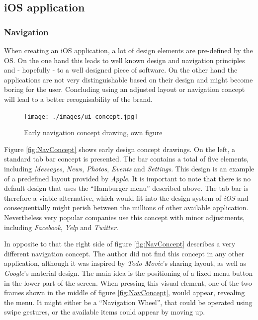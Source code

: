 \subsection{iOS application}
\label{sec:UIConceptiOS}
\subsubsection{Navigation}
When creating an iOS application, a lot of design elements are pre-defined by the \gls{OS}. On the one hand this leads to well known design and navigation principles and - hopefully - to a well designed piece of software. On the other hand the applications are not very distinguishable based on their design and might become boring for the user. Concluding using an adjusted layout or navigation concept will lead to a better recognisability of the brand. 

\begin{figure}[h]
  	\centering
  	\texttt{[image: ./images/ui-concept.jpg]}
  	\caption{Early navigation concept drawing, own figure}
	\label{fig:NavConcept}
\end{figure}

Figure \vref{fig:NavConcept} shows early design concept drawings. On the left, a standard tab bar concept is presented. The bar contains a total of five elements, including \emph{Messages}, \emph{News}, \emph{Photos}, \emph{Events} and \emph{Settings}. This design is an example of a predefined layout provided by \emph{Apple}. It is important to note that there is no default design that uses the \enquote{Hamburger menu} described above. The tab bar is therefore a viable alternative, which would fit into the design-system of \emph{iOS} and consequentially might perish between the millions of other available application. Nevertheless very popular companies use this concept with minor adjustments, including \emph{Facebook}, \emph{Yelp} and \emph{Twitter}.

In opposite to that the right side of figure \vref{fig:NavConcept} describes a very different navigation concept. The author did not find this concept in any other application, although it was inspired by \emph{Todo Movie}'s sharing layout, as well as \emph{Google}'s material design. The main idea is the positioning of a fixed menu button in the lower part of the screen. When pressing this visual element, one of the two frames shown in the middle of figure \vref{fig:NavConcept}, would appear, revealing the menu. It might either be a \enquote{Navigation Wheel}, that could be operated using swipe gestures, or the available items could appear by moving up.

